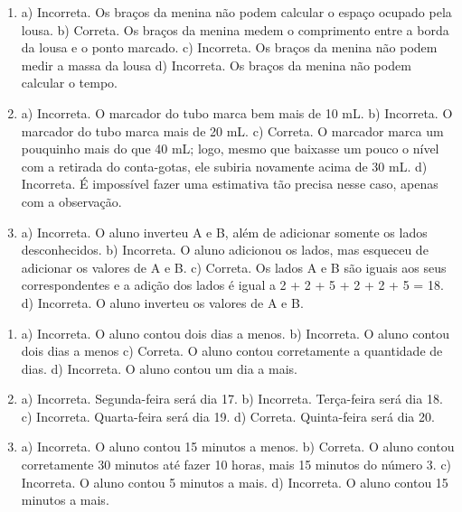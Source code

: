 
\begin{enumerate}
\item
a) Incorreta. Os braços da menina não podem calcular o espaço ocupado pela lousa.
b) Correta. Os braços da menina medem o comprimento entre a borda da lousa e o ponto marcado.
c) Incorreta. Os braços da menina não podem medir a massa da lousa
d) Incorreta. Os braços da menina não podem calcular o tempo.

\item
a) Incorreta. O marcador do tubo marca bem mais de 10 mL.
b) Incorreta. O marcador do tubo marca mais de 20 mL.
c) Correta. O marcador marca um pouquinho mais do que 40 mL; logo, mesmo que baixasse um pouco o nível com a retirada do conta-gotas, ele subiria novamente acima de 30 mL.
d) Incorreta. É impossível fazer uma estimativa tão precisa nesse caso, apenas com a observação.

\item
a) Incorreta. O aluno inverteu A e B, além de adicionar somente os lados desconhecidos.
b) Incorreta. O aluno adicionou os lados, mas esqueceu de adicionar os valores de A e B.
c) Correta. Os lados A e B são iguais aos seus correspondentes e a adição dos lados é igual a 2 + 2 + 5 + 2 + 2 + 5 = 18.
d) Incorreta. O aluno inverteu os valores de A e B.
\end{enumerate}


\begin{enumerate}
\item
a) Incorreta. O aluno contou dois dias a menos.
b) Incorreta. O aluno contou dois dias a menos
c) Correta. O aluno contou corretamente a quantidade de dias.
d) Incorreta. O aluno contou um dia a mais.

\item
a) Incorreta. Segunda-feira será dia 17.
b) Incorreta. Terça-feira será dia 18.
c) Incorreta. Quarta-feira será dia 19.
d) Correta. Quinta-feira será dia 20.

\item
a) Incorreta. O aluno contou 15 minutos a menos.
b) Correta. O aluno contou corretamente 30 minutos até fazer 10 horas, mais 15 minutos do número 3.
c) Incorreta. O aluno contou 5 minutos a mais.
d) Incorreta. O aluno contou 15 minutos a mais.
\end{enumerate}


